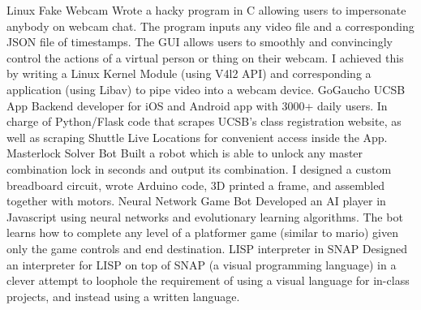 


\begin{cvskills}

  \vspace{1mm}
  \cvskill 
    {Linux Fake Webcam} %
    {Wrote a hacky program in C allowing users to impersonate anybody on webcam chat. The program inputs any video file and a corresponding JSON file of timestamps. The GUI allows users to smoothly and convincingly control the actions of a virtual person or thing on their webcam. I achieved this by writing a Linux Kernel Module (using V4l2 API) and corresponding a application (using Libav) to pipe video into a webcam device.} %
  \vspace{1mm}
  \cvskill
    {GoGaucho UCSB App} %
    {Backend developer for iOS and Android app with 3000+ daily users. In charge of Python/Flask code that scrapes UCSB's class registration website, as well as scraping Shuttle Live Locations for convenient access inside the App.} %
\cvskill
    {Masterlock Solver Bot} %
    {Built a robot which is able to unlock any master combination lock in seconds and output its combination. I designed a custom breadboard circuit, wrote Arduino code, 3D printed a frame, and assembled together with motors.} %
  \vspace{1mm}
\cvskill
  {Neural Network Game Bot}
  {Developed an AI player in Javascript using neural networks and evolutionary learning algorithms. The bot learns how to complete any level of a platformer game (similar to mario) given only the game controls and end destination.}
  \vspace{1mm}
  \cvskill
    {LISP interpreter in SNAP} %
    {Designed an interpreter for LISP on top of SNAP (a visual programming language) in a clever attempt to loophole the requirement of using a visual language for in-class projects, and instead using a written language.} %
  \vspace{1mm}

\end{cvskills}
